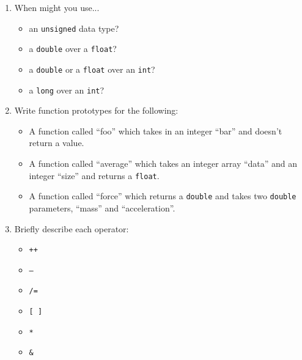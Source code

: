 \documentclass[letter,11pt]{article}
\begin{document}
\begin{enumerate}
    \item When might you use...
    \begin{itemize}
        \item an \texttt{unsigned} data type?
        \item a \texttt{double} over a \texttt{float}?
        \item a \texttt{double} or a \texttt{float} over an \texttt{int}?
        \item a \texttt{long} over an \texttt{int}?
    \end{itemize}
    
    \item Write function prototypes for the following:
    \begin{itemize}
        \item A function called ``foo'' which takes in an integer ``bar'' and doesn't return a value.
        \item A function called ``average'' which takes an integer array ``data'' and an integer ``size'' and returns a \texttt{float}.
        \item A function called ``force'' which returns a \texttt{double} and takes two \texttt{double} parameters, ``mass'' and ``acceleration''.
    \end{itemize}
    
    \item Briefly describe each operator:
    \begin{itemize}
        \item \texttt{++}
        \item \texttt{--}
        \item \texttt{/=}
        \item \texttt{[ ]}
        \item \texttt{*}
        \item \texttt{\&}
    \end{itemize}
\end{enumerate}
\end{document}
